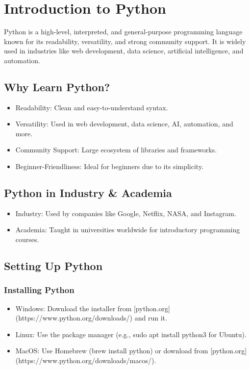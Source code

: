 \documentclass{article}
\begin{document}
\section{Introduction to Python}

Python is a high-level, interpreted, and general-purpose programming language known for its readability, versatility, and strong community support. It is widely used in industries like web development, data science, artificial intelligence, and automation.

\subsection{Why Learn Python?}

\begin{itemize}
    \item Readability: Clean and easy-to-understand syntax.
    \item Versatility: Used in web development, data science, AI, automation, and more.
    \item Community Support: Large ecosystem of libraries and frameworks.
    \item Beginner-Friendliness: Ideal for beginners due to its simplicity.
\end{itemize}

\subsection{Python in Industry \& Academia}

\begin{itemize}
    \item Industry: Used by companies like Google, Netflix, NASA, and Instagram.
    \item Academia: Taught in universities worldwide for introductory programming courses.
\end{itemize}

\subsection{Setting Up Python}

\subsubsection{Installing Python}

\begin{itemize}
    \item Windows: Download the installer from [python.org](https://www.python.org/downloads/) and run it.
    \item Linux: Use the package manager (e.g., sudo apt install python3 for Ubuntu).
    \item MacOS: Use Homebrew (brew install python) or download from [python.org](https://www.python.org/downloads/macos/).
\end{itemize}
\end{document}
